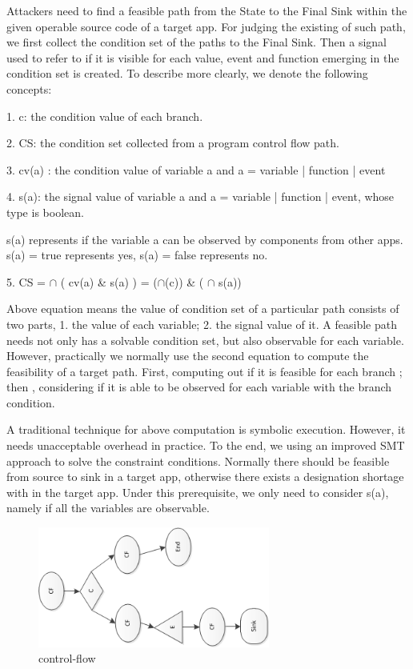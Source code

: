 \documentclass{sig-alternate-05-2015}
\begin{document}
Attackers need to find a feasible path from the State to the Final Sink within the given operable source code of a target app. For judging the existing of such path, we first collect the condition set of the paths to the Final Sink. Then a signal used to refer to if it is visible for each value, event and function emerging in the condition set is created. To describe more clearly, we denote the following concepts:

1. c: the condition value of each branch.

2. CS: the condition set collected from a program control flow path.

3. cv(a) : the condition value of variable a and a = variable | function | event

4. s(a): the signal value of variable a and a = variable | function | event, whose type is boolean.

s(a) represents if the variable a can be observed by components from other apps. s(a) = true represents yes, s(a) = false represents no.

5. CS = $\cap$ ( cv(a) \& s(a) ) = ($\cap$(c)) \& ( $\cap$ s(a))

Above equation means the value of condition set of a particular path consists of two parts, 1. the value of each variable; 2. the signal value of it.  A feasible path needs not only has a solvable condition set, but also observable for each variable. However, practically we normally use the second equation to compute the feasibility of a target path. First, computing out if it is feasible for each branch ; then , considering if it is able to be observed for each variable with the branch condition.

A traditional technique for above computation is symbolic execution. However, it needs unacceptable overhead in practice. {\color {red} To the end, we using an improved SMT approach to solve the constraint conditions.} Normally there should be feasible from source to sink in a target app, otherwise there exists a designation shortage with in the target app. Under this prerequisite, we only need to consider s(a), namely if all the variables are observable. 



\begin{figure}[t]
\centering
\includegraphics[width = 3.0in]{control-flow.png}
\caption{\label{}control-flow}
\end{figure}
\end{document}
